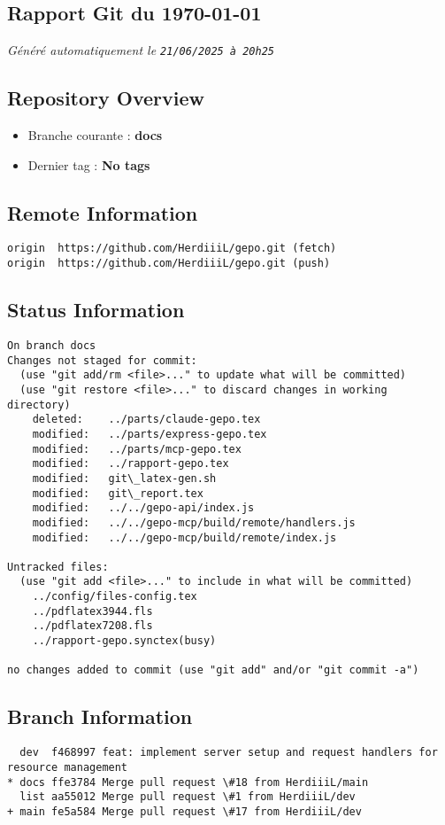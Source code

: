 \subsection*{Rapport Git du \today}
\textit{Généré automatiquement le \texttt{21/06/2025 à 20h25}}

\subsection*{Repository Overview}
\begin{itemize}
    \item Branche courante : \textbf{docs}
    \item Dernier tag : \textbf{No tags}
\end{itemize}

\subsection*{Remote Information}
\begin{verbatim}
origin	https://github.com/HerdiiiL/gepo.git (fetch)
origin	https://github.com/HerdiiiL/gepo.git (push)
\end{verbatim}

\subsection*{Status Information}
\begin{verbatim}
On branch docs
Changes not staged for commit:
  (use "git add/rm <file>..." to update what will be committed)
  (use "git restore <file>..." to discard changes in working directory)
	deleted:    ../parts/claude-gepo.tex
	modified:   ../parts/express-gepo.tex
	modified:   ../parts/mcp-gepo.tex
	modified:   ../rapport-gepo.tex
	modified:   git\_latex-gen.sh
	modified:   git\_report.tex
	modified:   ../../gepo-api/index.js
	modified:   ../../gepo-mcp/build/remote/handlers.js
	modified:   ../../gepo-mcp/build/remote/index.js

Untracked files:
  (use "git add <file>..." to include in what will be committed)
	../config/files-config.tex
	../pdflatex3944.fls
	../pdflatex7208.fls
	../rapport-gepo.synctex(busy)

no changes added to commit (use "git add" and/or "git commit -a")
\end{verbatim}

\subsection*{Branch Information}
\begin{verbatim}
  dev  f468997 feat: implement server setup and request handlers for resource management
* docs ffe3784 Merge pull request \#18 from HerdiiiL/main
  list aa55012 Merge pull request \#1 from HerdiiiL/dev
+ main fe5a584 Merge pull request \#17 from HerdiiiL/dev
\end{verbatim}

